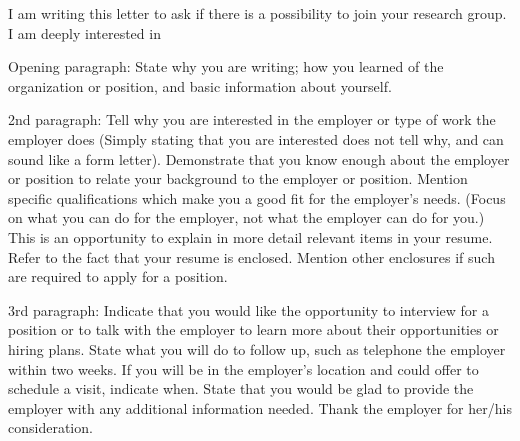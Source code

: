\documentclass[11pt, a4paper]{awesome-cv}
\begin{document}
\makecvheader

\makelettertitle

\begin{cvletter}


I am writing this letter to ask if there is a possibility to join your research group. I am deeply interested in 



Opening paragraph: State why you are writing; how you learned of the organization or position, and basic information about yourself.

2nd paragraph: Tell why you are interested in the employer or type of work the employer does (Simply stating that you are interested does not tell why, and can sound like a form letter). Demonstrate that you know enough about the employer or position to relate your background to the employer or position. Mention specific qualifications which make you a good fit for the employer’s needs. (Focus on what you can do for the employer, not what the employer can do for you.) This is an opportunity to explain in more detail relevant items in your resume. Refer to the fact that your resume is enclosed. Mention other enclosures if such are required to apply for a position.

3rd paragraph: Indicate that you would like the opportunity to interview for a position or to talk with the employer to learn more about their opportunities or hiring plans. State what you will do to follow up, such as telephone the employer within two weeks. If you will be in the employer’s location and could offer to schedule a visit, indicate when. State that you would be glad to provide the employer with any additional information needed. Thank the employer for her/his consideration.

\end{cvletter}

\makeletterclosing
\end{document}
